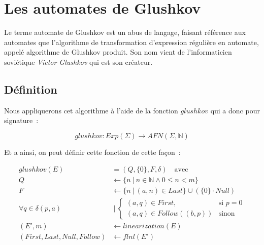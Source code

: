\section{Les automates de Glushkov}\label{sec:glushkov}

Le terme \og{}automate de Glushkov\fg{} est un abus de langage, faisant
référence aux automates que l'algorithme de transformation d'expression
régulière en automate, appelé algorithme de Glushkov produit. Son nom vient de
l'informaticien soviétique \textit{Victor Glushkov} qui est son créateur.

\subsection{Définition}

Nous appliquerons cet algorithme à l'aide de la fonction \(glushkov\) qui a
donc pour signature~:

\[
    glushkov: Exp(\Sigma) \to AFN(\Sigma, \mathbb{N})
\]

Et a ainsi, on peut définir cette fonction de cette façon~:

\begin{align*}
    glushkov (E) & = (Q, \{0\}, F, \delta) \quad \text{avec}                                                                      \\
    Q & \leftarrow \{n ~|~ n \in \mathbb{N} \land 0 \leq n < m\}                                                       \\
    F & \leftarrow \{n ~|~ (a, n) \in Last\} \cup (\{0\} \cdot Null)                                                   \\
    \forall q                    \in \delta(p, a) & ~|~ \begin{cases} (a, q) \in First, & \text{si } p = 0 \\ (a, q) \in Follow((b, p)) & \text{sinon} \end{cases} \\
    (E', m)                                       & \leftarrow linearization(E)                                                                                    \\
    (First, Last, Null, Follow)                   & \leftarrow flnl(E')
\end{align*}

